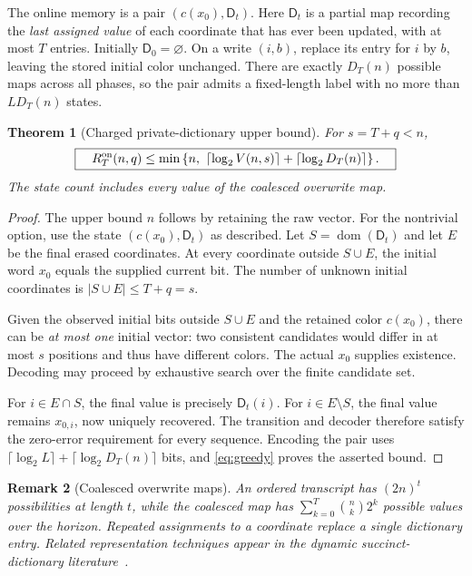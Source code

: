 \documentclass[11pt,a4paper]{article}
\newtheorem{theorem}{Theorem}[section]
\newtheorem{remark}[theorem]{Remark}
\newcommand{\Dic}{\mathsf D}
\begin{document}
The online memory is a pair $(c(x_0),\Dic_t)$. Here $\Dic_t$ is a partial map recording the \emph{last assigned value} of each coordinate that has ever been updated, with at most $T$ entries. Initially $\Dic_0=\varnothing$. On a write $(i,b)$, replace its entry for $i$ by $b$, leaving the stored initial color unchanged. There are exactly $D_T(n)$ possible maps across all phases, so the pair admits a fixed-length label with no more than $L D_T(n)$ states.

\begin{theorem}[Charged private-dictionary upper bound]\label{thm:upper}
For $s=T+q<n$,
\begin{equation}\label{eq:upper}
\boxed{\quad R_T^{\rm on}(n,q)\le \min\left\{n,\ \left\lceil\log_2 V(n,s)\right\rceil+\left\lceil\log_2 D_T(n)\right\rceil\right\}.\quad}
\end{equation}
The state count includes every value of the coalesced overwrite map.
\end{theorem}
\begin{proof}
The upper bound $n$ follows by retaining the raw vector. For the nontrivial option, use the state $(c(x_0),\Dic_t)$ as described. Let $S=\operatorname{dom}(\Dic_t)$ and let $E$ be the final erased coordinates. At every coordinate outside $S\cup E$, the initial word $x_0$ equals the supplied current bit. The number of unknown initial coordinates is $|S\cup E|\le T+q=s$.

Given the observed initial bits outside $S\cup E$ and the retained color $c(x_0)$, there can be \emph{at most one} initial vector: two consistent candidates would differ in at most $s$ positions and thus have different colors. The actual $x_0$ supplies existence. Decoding may proceed by exhaustive search over the finite candidate set.

For $i\in E\cap S$, the final value is precisely $\Dic_t(i)$. For $i\in E\setminus S$, the final value remains $x_{0,i}$, now uniquely recovered. The transition and decoder therefore satisfy the zero-error requirement for every sequence. Encoding the pair uses $\lceil\log_2L\rceil+\lceil\log_2D_T(n)\rceil$ bits, and \eqref{eq:greedy} proves the asserted bound.
\end{proof}

\begin{remark}[Coalesced overwrite maps]
An ordered transcript has $(2n)^t$ possibilities at length $t$, while the coalesced map has $\sum_{k=0}^T\binom nk2^k$ possible values over the horizon. Repeated assignments to a coordinate replace a single dictionary entry. Related representation techniques appear in the dynamic succinct-dictionary literature~\cite{li2023,domingues2026}.
\end{remark}
\end{document}
